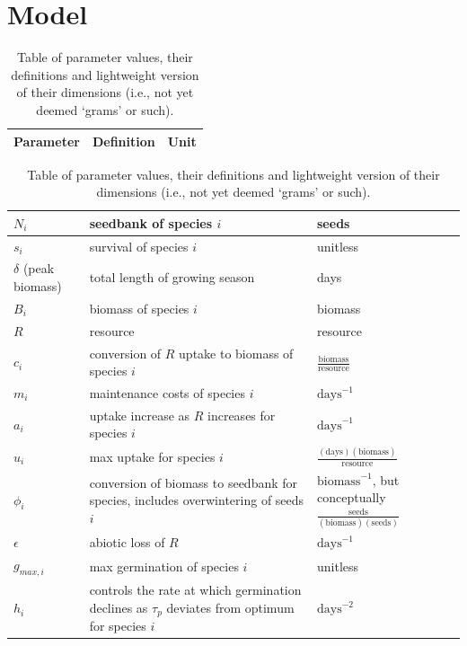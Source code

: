 \documentclass[11pt,letter]{article}
\begin{document}

\newpage 
\clearpage
\section{Model}

\begin{center}
\begin{table}[h!]
\caption{Table of parameter values, their definitions and lightweight version of their dimensions (i.e., not yet deemed `grams' or such).}
\begin{tabular}{ | p{3.0cm} | p{6.0cm} | p{4.0cm} |}
\hline 
Parameter & Definition & Unit \\ \hline 
\end{tabular}
\begin{tabular}{ | p{3.0cm} | p{6.0cm} | p{4.0cm} |}
\(N_{i}\) & seedbank of species \(i\) & seeds \\ \hline
\(s_{i}\) & survival of species \(i\) & unitless \\ \hline
\(\delta\) (peak biomass) & total length of growing season & days\\ \hline
\(B_{i}\) & biomass of species \(i\) & biomass \\ \hline
\(R\) & resource & resource\\ \hline
\(c_{i}\) & conversion of \(R\) uptake to biomass of species \(i\) &  \(\frac{\text{biomass}}{\text{resource}}\) \\ \hline
\(m_{i}\) & maintenance costs of species \(i\) & \(\text{days}^{-1}\) \\ \hline
\(a_{i}\) & uptake increase as \(R\) increases for species \(i\) & \(\text{days}^{-1}\) \\ \hline
\(u_{i}\) & max uptake for species \(i\) & \(\frac{(\text{days})(\text{biomass})}{\text{resource}}\) \\ \hline
\(\phi_{i}\) & conversion of biomass to seedbank for species, includes overwintering of seeds \(i\) & \(\text{biomass}^{-1}\), but conceptually \(\frac{\text{seeds}}{(\text{biomass})(\text{seeds})}\) \\ \hline
\(\epsilon\) & abiotic loss of \(R\) &  \(\text{days}^{-1}\) \\ \hline
\(g_{max,i}\) & max germination of species \(i\) & unitless \\ \hline
\(h_{i}\) &  controls the rate at which germination declines as \(\tau_{p}\) deviates from optimum for species \(i\)  & \(\text{days}^{-2}\) \\ \hline

\end{tabular}
\end{table}
\end{center}
\end{document}
